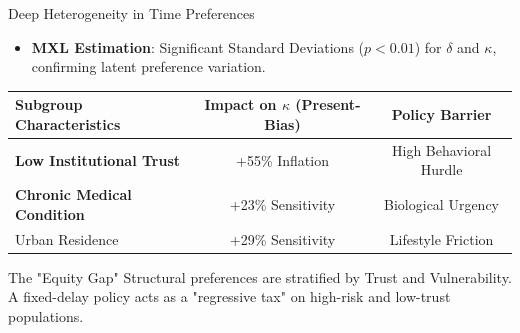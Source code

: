 \documentclass[10pt]{beamer}
\begin{document}
\begin{frame}{Deep Heterogeneity in Time Preferences}
    \begin{itemize}
        \item \textbf{MXL Estimation}: Significant Standard Deviations ($p<0.01$) for $\delta$ and $\kappa$, confirming \alert{latent preference variation}.
    \end{itemize}
    \begin{table}[]
        \centering \small
        \begin{tabular}{lcc}
            \toprule
            Subgroup Characteristics & Impact on $\kappa$ (Present-Bias) & Policy Barrier \\
            \midrule
            \textbf{Low Institutional Trust} & \alert{+55\% Inflation} & High Behavioral Hurdle \\
            \textbf{Chronic Medical Condition} & \alert{+23\% Sensitivity} & Biological Urgency \\
            Urban Residence & +29\% Sensitivity & Lifestyle Friction \\
            \bottomrule
        \end{tabular}
    \end{table}
    \vfill
    \begin{exampleblock}{The "Equity Gap"}
        \small Structural preferences are stratified by \alert{Trust} and \alert{Vulnerability}. A fixed-delay policy acts as a "regressive tax" on high-risk and low-trust populations.
    \end{exampleblock}
\end{frame}










\end{document}
